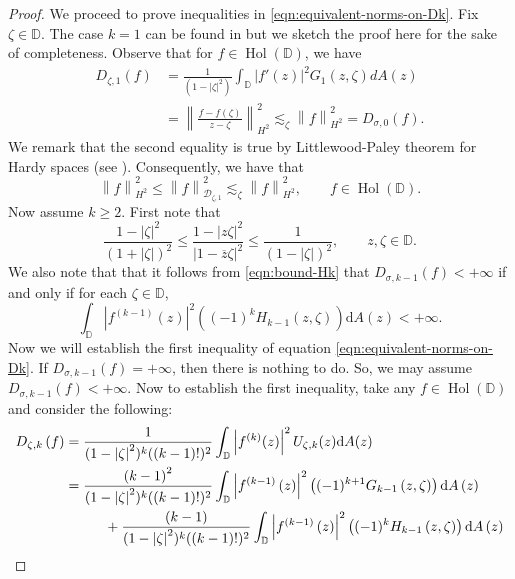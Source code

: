 \documentclass[10pt,oneside,reqno]{amsart}
\theoremstyle{definition}
\theoremstyle{remark}
\newcommand{\norm}[1]{\left\lVert #1 \right\rVert}
\newcommand{\abs}[1]{\left\lvert #1 \right\rvert}
\renewcommand{\le}{\leqslant}
\renewcommand{\ge}{\geqslant}
\newcommand{\D}{\mathbb D}
\numberwithin{equation}{section}
\begin{document}
\begin{proof}
    We proceed to prove inequalities in \eqref{eqn:equivalent-norms-on-Dk}.
        Fix $\zeta \in \mathbb D$. The case $k=1$ can be found in \cite{1993multiplication} but we sketch the proof here for the sake of completeness. Observe that for $f \in \operatorname{Hol} \left( \D \right)$, we have 
    \begin{align*}
	D_{\zeta, 1}(f) &= \frac{1}{(1-|\zeta|^2)} \int_{\D} \abs{f'\left( z \right)}^{2} G_{1} \left( z, \zeta \right) dA \left( z \right) \\
	&= \norm{\frac{f-f\left( \zeta \right)}{z-\zeta}}_{H^{2}}^{2} \lesssim_{\zeta} \norm{f}_{H^{2}}^{2} = D_{\sigma, 0} \left( f \right).
    \end{align*}
    We remark that the second equality is true by Littlewood-Paley theorem for Hardy spaces (see \cite[Chapter VI, Lemma 3.1]{GarnettBAF}). Consequently, we have that
    \begin{equation*}
	\norm{f}_{H^{2}}^{2} \le \norm{f}_{\mathscr D_{\zeta, 1}}^{2} \lesssim_{\zeta} \norm{f}_{H^{2}}^{2}, \qquad  f \in \operatorname{Hol} \left( \D \right).
    \end{equation*} 
Now assume $k \ge 2$. First note that 
     \begin{equation}
         \frac{1-\abs{\zeta}^2}{(1+\abs{\zeta})^2} \le \frac{1-\abs{z\zeta}^2}{\abs{1-\overline{z}\zeta}^{2}} \le \frac{1}{(1-\abs{\zeta})^2}, \qquad z, \zeta\in \D.
         \label{eqn:bound-Hk}
    \end{equation}
    We also note that that it follows from \eqref{eqn:bound-Hk} that  $D_{\sigma, k-1} (f) < + \infty$ if and only if for each $\zeta \in \D$, $$\int_{\D} \abs{f^{(k-1)} \left( z \right)}^2 \left( (-1)^{k} H_{k-1} \left( z, \zeta \right) \right)\mathrm{d}A\left( z \right) < +\infty.$$
    Now we will establish the first inequality of equation \eqref{eqn:equivalent-norms-on-Dk}. If $D_{\sigma, k-1}(f) = +\infty$, then there is nothing to do. So, we may assume $D_{\sigma, k-1} (f) < +\infty.$  Now to establish the first inequality, take any $f \in \operatorname{Hol} \left( \D \right)$ and consider the following:
    \begin{align*}
	D_{\zeta, k} \left( f \right) &= \frac{1}{(1-\abs{\zeta}^2)^{k} ((k-1)!)^2} \int_{\D} \abs{f ^{\left( k \right)} (z)} ^{2} U_{\zeta, k} (z) \mathrm{d}A(z) \\
	&= \frac{\left( k-1 \right)^{2}}{(1-\abs{\zeta}^2)^{k} ((k-1)!)^2} \int_{\D} \abs{f^{(k-1)} \left( z \right)}^2 \left((-1)^{k+1} G_{k-1} \left( z, \zeta \right)  \right) \mathrm{d}A\left( z \right) \\ & \hspace{10mm}+ \frac{\left( k-1 \right)}{(1-\abs{\zeta}^2)^{k} ((k-1)!)^2} \int_{\D} \abs{f^{(k-1)} \left( z \right)}^2 \left( (-1)^{k} H_{k-1} \left( z, \zeta \right) \right)\mathrm{d}A\left( z \right) \\

\end{align*}
\end{proof}
\end{document}
